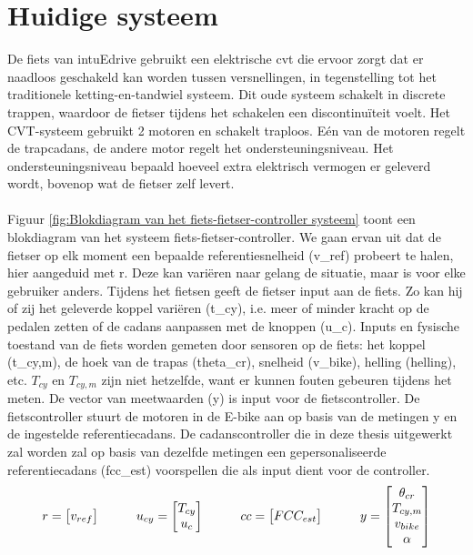 \section{Huidige systeem}
De fiets van intuEdrive gebruikt een elektrische \gls{cvt} die ervoor zorgt dat er naadloos geschakeld kan worden tussen versnellingen, in tegenstelling tot het traditionele ketting-en-tandwiel systeem. Dit oude systeem schakelt in discrete trappen, waardoor de fietser tijdens het schakelen een discontinuïteit voelt. Het CVT-systeem gebruikt 2 motoren en schakelt traploos. Eén van de motoren regelt de trapcadans, de andere motor regelt het ondersteuningsniveau. Het ondersteuningsniveau bepaald hoeveel extra elektrisch vermogen er geleverd wordt, bovenop wat de fietser zelf levert.
\\\\
Figuur \ref{fig:Blokdiagram van het fiets-fietser-controller systeem} toont een blokdiagram van het systeem fiets-fietser-controller. We gaan ervan uit dat de fietser op elk moment een bepaalde referentiesnelheid (\gls{v_ref}) probeert te halen, hier aangeduid met r. Deze kan variëren naar gelang de situatie, maar is voor elke gebruiker anders. Tijdens het fietsen geeft de fietser input aan de fiets. Zo kan hij of zij het geleverde koppel variëren (\gls{t_cy}), i.e. meer of minder kracht op de pedalen zetten of de cadans aanpassen met de knoppen (\gls{u_c}). Inputs en fysische toestand van de fiets worden gemeten door sensoren op de fiets: het koppel (\gls{t_cy,m}), de hoek van de trapas (\gls{theta_cr}), snelheid (\gls{v_bike}), helling (\gls{helling}), etc. $T_{cy}$ en $T_{cy,m}$ zijn niet hetzelfde, want er kunnen fouten gebeuren tijdens het meten. De vector van meetwaarden (\gls{y}) is input voor de fietscontroller. De fietscontroller stuurt de motoren in de E-bike aan op basis van de metingen \gls{y} en de ingestelde referentiecadans. De cadanscontroller die in deze thesis uitgewerkt zal worden zal op basis van dezelfde metingen een gepersonaliseerde referentiecadans (\gls{fcc_est}) voorspellen die als input dient voor de controller.
\begin{gather*}
r = \begin{bmatrix}
       v_{ref}  
     \end{bmatrix} \hspace*{1cm}
u_{cy} = \begin{bmatrix}
       T_{cy} \\ u_c  
     \end{bmatrix} \hspace*{1cm}
cc = \begin{bmatrix}
       FCC_{est}  
     \end{bmatrix} \hspace*{1cm}
y = \begin{bmatrix} 
       \theta _{cr} \\ T_{cy,m} \\ v_{bike} \\ \alpha
     \end{bmatrix} 
\end{gather*}
